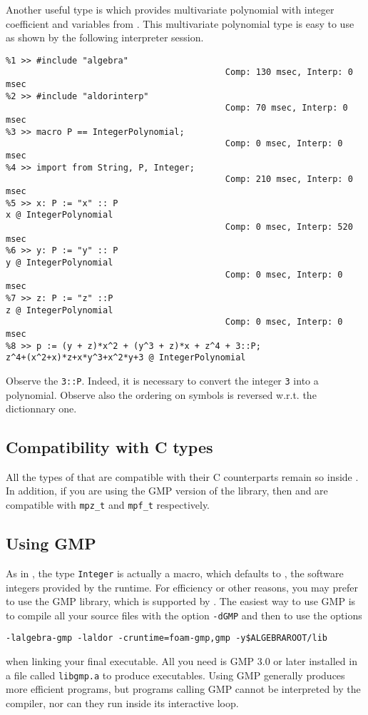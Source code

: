 Another useful type is 
which provides multivariate polynomial with integer coefficient
and variables from .
This multivariate polynomial type is easy to use as
shown by the following interpreter session.
\begin{verbatim}
%1 >> #include "algebra"
                                           Comp: 130 msec, Interp: 0 msec
%2 >> #include "aldorinterp"
                                           Comp: 70 msec, Interp: 0 msec
%3 >> macro P == IntegerPolynomial;
                                           Comp: 0 msec, Interp: 0 msec
%4 >> import from String, P, Integer;
                                           Comp: 210 msec, Interp: 0 msec
%5 >> x: P := "x" :: P
x @ IntegerPolynomial
                                           Comp: 0 msec, Interp: 520 msec
%6 >> y: P := "y" :: P        
y @ IntegerPolynomial
                                           Comp: 0 msec, Interp: 0 msec
%7 >> z: P := "z" ::P
z @ IntegerPolynomial
                                           Comp: 0 msec, Interp: 0 msec
%8 >> p := (y + z)*x^2 + (y^3 + z)*x + z^4 + 3::P;
z^4+(x^2+x)*z+x*y^3+x^2*y+3 @ IntegerPolynomial
\end{verbatim}
Observe the {\tt 3::P}. Indeed, it is necessary to convert
the integer {\tt 3} into a polynomial.
Observe also the ordering on symbols is reversed w.r.t. the dictionnary one.

\subsection{Compatibility with C types}
All the types of \libaldor{} that are compatible with their C counterparts
remain so inside \libalgebra. In addition, if you are using the GMP version
of the library, then  and 
are compatible with {\tt mpz\_t} and {\tt mpf\_t} respectively.

\subsection{Using GMP}
As in \libaldor, the type {\tt Integer} is actually a macro,
which defaults to , the software integers provided
by the \aldor{} runtime. For efficiency or other reasons, you may prefer
to use the GMP library, which is supported by \libalgebra.
The easiest way
to use GMP is to compile all your source files with the option {\tt -dGMP}
and then to use the options
\begin{center}
{\tt -lalgebra-gmp -laldor -cruntime=foam-gmp,gmp -y\$ALGEBRAROOT/lib}
\end{center}
when linking your final executable. All you need is GMP 3.0 or later
installed in a file called {\tt libgmp.a} to produce executables.
Using GMP generally produces more efficient programs,
but programs calling GMP cannot be interpreted by the \aldor{}
compiler, nor can they run inside its interactive loop.

